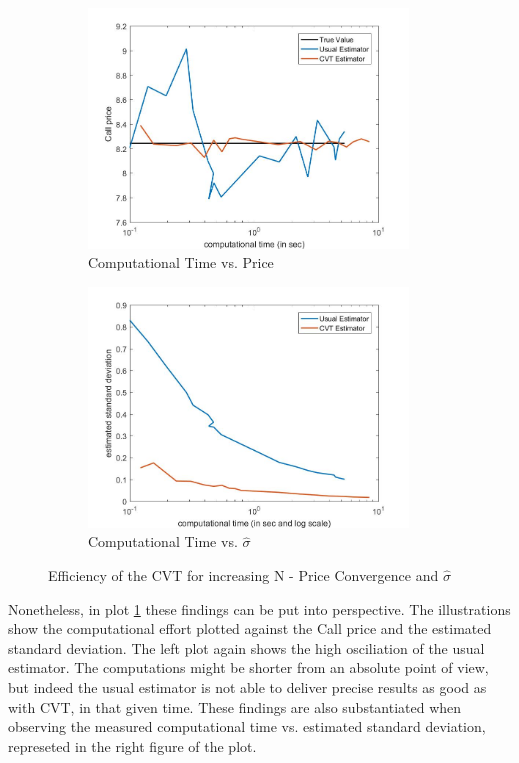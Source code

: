 \documentclass[a4paper,11pt]{article}
\begin{document}
{\begin{figure}[!h]
\centering
\begin{subfigure}[c]{0.5\textwidth}
\caption*{Computational Time vs. Price}
\includegraphics[width=8.5cm]{plot24.jpeg}
\end{subfigure}
\begin{subfigure}[c]{0.4\textwidth}
\caption*{Computational Time vs. $\hat{\sigma}$}
\includegraphics[width=8.5cm]{plot25.jpeg}
\end{subfigure}
\caption{Efficiency of the CVT for increasing N - Price Convergence and  $\hat{\sigma}$}
\label{plot27}
\end{figure}

Nonetheless, in plot \ref{plot27} these findings can be put into perspective. The illustrations show the computational effort  plotted against the Call price and the estimated standard deviation. The left plot again shows the high osciliation of the usual estimator. The computations might be shorter from an absolute point of view, but indeed the usual estimator is not able to deliver precise results as good as with CVT, in that given time. These findings are also  substantiated when observing the measured computational time vs. estimated standard deviation, represeted in the right figure of the plot.

}
\end{document}
